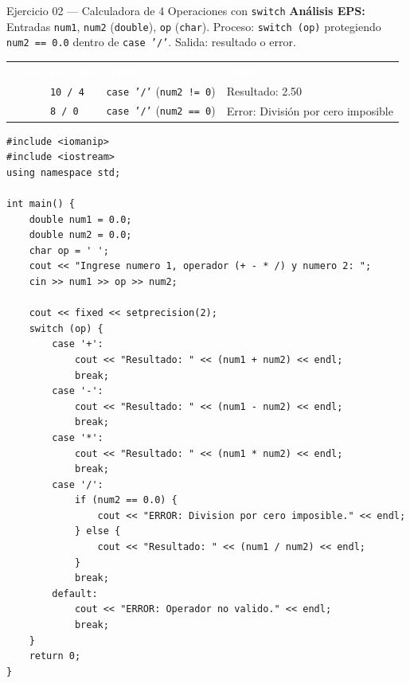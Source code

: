 \documentclass[11pt,letterpaper]{article}
\begin{document}
\begin{solucion}{Ejercicio 02 --- Calculadora de 4 Operaciones con \texttt{switch}}
\textbf{Análisis EPS:} Entradas \texttt{num1}, \texttt{num2} (\texttt{double}), \texttt{op} (\texttt{char}). Proceso: \texttt{switch (op)} protegiendo \texttt{num2 == 0.0} dentro de \texttt{case '/'}. Salida: resultado o error.\\[4pt]
\footnotesize
\renewcommand{\arraystretch}{1.18}
\begin{tabularx}{\linewidth}{>{\centering\arraybackslash}p{1.2cm} >{\centering\arraybackslash}p{2.6cm} >{\centering\arraybackslash}p{2.8cm} X}
  \rowcolor{AzulMarino}
  \textcolor{white}{\textbf{Caso}} & \textcolor{white}{\textbf{Entrada}} & \textcolor{white}{\textbf{Rama}} & \textcolor{white}{\textbf{Salida}} \\
  1 & \texttt{10 / 4} & \texttt{case '/'} (\texttt{num2 != 0}) & Resultado: 2.50 \\
  2 & \texttt{8 / 0} & \texttt{case '/'} (\texttt{num2 == 0}) & Error: División por cero imposible \\
  \bottomrule
\end{tabularx}
\end{solucion}

\begin{lstlisting}[style=cppmonitoria, caption={Solución E02 en C++}]
#include <iomanip>
#include <iostream>
using namespace std;

int main() {
    double num1 = 0.0;
    double num2 = 0.0;
    char op = ' ';
    cout << "Ingrese numero 1, operador (+ - * /) y numero 2: ";
    cin >> num1 >> op >> num2;

    cout << fixed << setprecision(2);
    switch (op) {
        case '+':
            cout << "Resultado: " << (num1 + num2) << endl;
            break;
        case '-':
            cout << "Resultado: " << (num1 - num2) << endl;
            break;
        case '*':
            cout << "Resultado: " << (num1 * num2) << endl;
            break;
        case '/':
            if (num2 == 0.0) {
                cout << "ERROR: Division por cero imposible." << endl;
            } else {
                cout << "Resultado: " << (num1 / num2) << endl;
            }
            break;
        default:
            cout << "ERROR: Operador no valido." << endl;
            break;
    }
    return 0;
}
\end{lstlisting}
\end{document}
